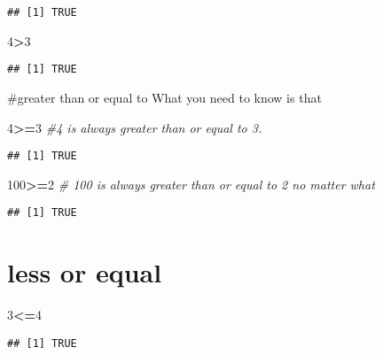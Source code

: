 \documentclass[
]{article}
\newenvironment{Shaded}{\begin{snugshade}}{\end{snugshade}}
\newcommand{\CommentTok}[1]{\textcolor[rgb]{0.56,0.35,0.01}{\textit{#1}}}
\newcommand{\DecValTok}[1]{\textcolor[rgb]{0.00,0.00,0.81}{#1}}
\newcommand{\SpecialCharTok}[1]{\textcolor[rgb]{0.81,0.36,0.00}{\textbf{#1}}}
\begin{document}
\begin{verbatim}
## [1] TRUE
\end{verbatim}

\begin{Shaded}
\begin{Highlighting}[]
\DecValTok{4}\SpecialCharTok{\textgreater{}}\DecValTok{3}
\end{Highlighting}
\end{Shaded}

\begin{verbatim}
## [1] TRUE
\end{verbatim}

\#greater than or equal to What you need to know is that

\begin{Shaded}
\begin{Highlighting}[]
\DecValTok{4}\SpecialCharTok{\textgreater{}=}\DecValTok{3} \CommentTok{\#4 is always greater than or equal to 3.}
\end{Highlighting}
\end{Shaded}

\begin{verbatim}
## [1] TRUE
\end{verbatim}

\begin{Shaded}
\begin{Highlighting}[]
\DecValTok{100}\SpecialCharTok{\textgreater{}=}\DecValTok{2} \CommentTok{\# 100 is always greater than or equal to 2 no matter what}
\end{Highlighting}
\end{Shaded}

\begin{verbatim}
## [1] TRUE
\end{verbatim}

\hypertarget{less-or-equal}{%
\section{less or equal}\label{less-or-equal}}

\begin{Shaded}
\begin{Highlighting}[]
\DecValTok{3}\SpecialCharTok{\textless{}=}\DecValTok{4}
\end{Highlighting}
\end{Shaded}

\begin{verbatim}
## [1] TRUE
\end{verbatim}
\end{document}
